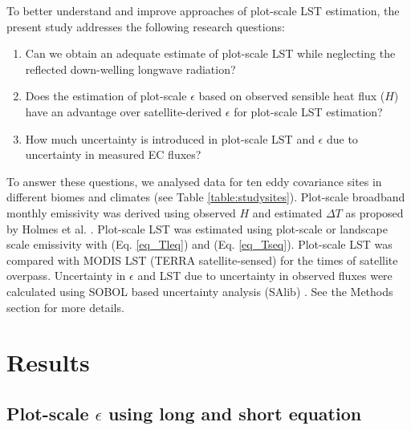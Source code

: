 \documentclass[fleqn,10pt]{wlscirep}
\begin{document}
To better understand and improve approaches of plot-scale LST estimation, the present study addresses the following research questions:
\begin{enumerate}
	\item Can we obtain an adequate estimate of plot-scale LST while neglecting the reflected down-welling longwave radiation?
	\item Does the estimation of plot-scale $\epsilon$ based on observed sensible heat flux ($H$) have an advantage over satellite-derived $\epsilon$ for plot-scale LST estimation?
    \item How much uncertainty is introduced in plot-scale LST and $\epsilon$ due to uncertainty in measured EC fluxes?
    
\end{enumerate}    
To answer these questions, we analysed data for ten eddy covariance sites in different biomes and climates (see Table \ref{table:studysites}).
Plot-scale broadband monthly emissivity was derived using observed $H$ and estimated $\Delta T$ as proposed by Holmes et al. \cite{holmes_land_2009}.  Plot-scale LST was estimated using plot-scale or landscape scale emissivity with (Eq. \ref{eq_Tleq}) and (Eq. \ref{eq_Tseq}). Plot-scale LST was compared with MODIS LST (TERRA satellite-sensed) for the times of satellite overpass. Uncertainty in $\epsilon$ and LST due to uncertainty in observed fluxes were calculated using SOBOL based uncertainty analysis (SAlib) \cite{rosolem2012fully}. See the Methods section for more details.

\section{Results}

\subsection{Plot-scale $\epsilon$ using long and short equation}
\end{document}
